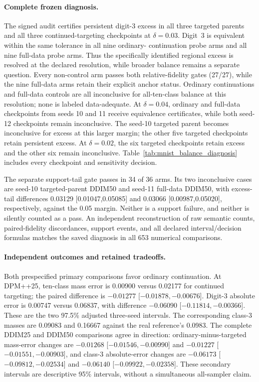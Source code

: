 \paragraph{Complete frozen diagnosis.}
The signed audit certifies persistent digit-3 excess in all three targeted
parents and all three continued-targeting checkpoints at $\delta=0.03$.
Digit~3 is equivalent within the same tolerance in all nine ordinary-
continuation probe arms and all nine full-data probe arms. Thus the
specifically identified regional excess is resolved at the declared
resolution, while broader balance remains a separate question.
Every non-control arm passes both relative-fidelity gates (27/27), while
the nine full-data arms retain their explicit anchor status. Ordinary
continuations and full-data controls are all inconclusive for all-ten-class
balance at this resolution; none is labeled data-adequate. At $\delta=0.04$,
ordinary and full-data checkpoints from seeds 10 and 11 receive equivalence
certificates, while both seed-12 checkpoints remain inconclusive. The
seed-10 targeted parent becomes inconclusive for excess at this larger
margin; the other five targeted checkpoints retain persistent excess.
At $\delta=0.02$, the six targeted checkpoints retain excess and the other six
remain inconclusive. Table~\ref{tab:mnist_balance_diagnosis} includes every
checkpoint and sensitivity decision.

The separate support-tail gate passes in 34 of 36 arms. Its two inconclusive
cases are seed-10 targeted-parent DDIM50 and seed-11 full-data DDIM50, with
excess-tail differences 0.03129 [0.01047,0.05085] and
0.03066 [0.00987,0.05020], respectively, against the 0.05 margin.
Neither is a support failure, and neither is silently counted as a pass.
An independent reconstruction of raw semantic counts, paired-fidelity
discordances, support events, and all declared interval/decision formulas
matches the saved diagnosis in all 653 numerical comparisons.



\paragraph{Independent outcomes and retained tradeoffs.}
Both prespecified primary comparisons favor ordinary continuation.
At DPM++25, ten-class mass error is 0.00900 versus 0.02177 for continued
targeting; the paired difference is $-0.01277$
[$-0.01878,-0.00676$]. Digit-3 absolute error is 0.00747 versus 0.06837,
with difference $-0.06090$ [$-0.11814,-0.00366$]. These are the two
97.5\% adjusted three-seed intervals. The corresponding class-3 masses are
0.09083 and 0.16667 against the real reference's 0.0983. The complete
DDIM25 and DDIM50 comparisons agree in direction: ordinary-minus-targeted
mass-error changes are $-0.01268$ [$-0.01546,-0.00990$] and
$-0.01227$ [$-0.01551,-0.00903$], and class-3 absolute-error changes are
$-0.06173$ [$-0.09812,-0.02534$] and
$-0.06140$ [$-0.09922,-0.02358$]. These secondary intervals are descriptive
95\% intervals, without a simultaneous all-sampler claim.

